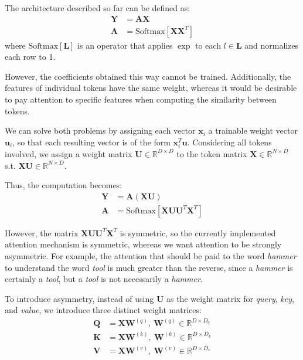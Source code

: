 The architecture described so far can be defined as:
\[
\begin{aligned}
\mathbf{Y} &= \mathbf{A}\mathbf{X} \\
\mathbf{A} &= \text{Softmax}\left[\mathbf{X}\mathbf{X}^{T}\right]
\end{aligned}
\]
where $\text{Softmax}\left[\mathbf{L}\right]$ is an operator that applies $\exp$ to each $l \in \mathbf{L}$ and normalizes each row to 1.

However, the coefficients obtained this way cannot be trained. Additionally, the features of individual tokens have the same weight, whereas it would be desirable to pay attention to specific features when computing the similarity between tokens.

We can solve both problems by assigning each vector $\mathbf{x}_i$ a trainable weight vector $\mathbf{u}_i$, so that each resulting vector is of the form $\mathbf{x}_{i}^{T}\mathbf{u}$. 
Considering all tokens involved, we assign a weight matrix $\mathbf{U} \in \mathbb{R}^{D \times D}$ to the token matrix $\mathbf{X} \in \mathbb{R}^{N \times D}$ s.t. \(\mathbf{X}\mathbf{U}\in \mathbb{R}^{N\times D}\).

Thus, the computation becomes:
\[
\begin{aligned}
\mathbf{Y}&=\mathbf{A}\left(\mathbf{X}\mathbf{U}\right) \\
\mathbf{A}&=\text{Softmax}\left[\mathbf{X}\mathbf{U}\mathbf{U}^{T}\mathbf{X}^{T}\right]
\end{aligned}
\]

However, the matrix $\mathbf{X}\mathbf{U}\mathbf{U}^{T}\mathbf{X}^{T}$ is symmetric, so the currently implemented attention mechanism is symmetric, whereas we want attention to be strongly asymmetric. For example, the attention that should be paid to the word \textit{hammer} to understand the word \textit{tool} is much greater than the reverse, since a \textit{hammer} is certainly a \textit{tool}, but a \textit{tool} is not necessarily a \textit{hammer}.

To introduce asymmetry, instead of using $\mathbf{U}$ as the weight matrix for \textit{query}, \textit{key}, and \textit{value}, we introduce three distinct weight matrices:
\[
\begin{aligned}
\mathbf{Q}&=\mathbf{X}\mathbf{W}^{(q)},\:\mathbf{W}^{(q)} \in \mathbb{R}^{D \times D_q} \\
\mathbf{K}&=\mathbf{X}\mathbf{W}^{(k)},\:\mathbf{W}^{(k)} \in \mathbb{R}^{D \times D_k} \\
\mathbf{V}&=\mathbf{X}\mathbf{W}^{(v)},\:\mathbf{W}^{(v)} \in \mathbb{R}^{D \times D_v}
\end{aligned}
\]

